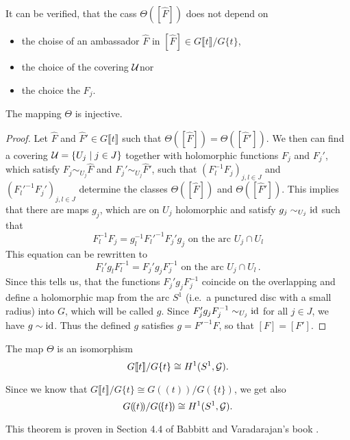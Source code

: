 It can be verified, that the cass $\Theta([\hat F])$ does not depend on
\begin{itemize}
  \item the choise of an ambassador $\hat F$ in
    $[\hat F]\in G\llbracket t\rrbracket/G\{t\}$\PROBLEM[proof!],
  \item the choice of the covering $\mathcal{U}$\PROBLEM[proof!] nor
  \item the choice the $F_j$\PROBLEM[proof!].
\end{itemize}
\begin{lem}
  The mapping $\Theta$ is injective.
\end{lem}
\begin{proof}
  Let $\hat F$ and $\hat F'\in G\llbracket t\rrbracket$ such that
  $\Theta([\hat F])=\Theta([\hat F'])$.
  We then can find a covering $\mathcal{U}=\{U_j\mid j\in J\}$ together with
  holomorphic functions $F_j$ and $F_j'$, which satisfy
  $F_j\sim_{U_j}\hat F$ and $F_j'\sim_{U_j}\hat F'$, such that
  $(F_l^{-1}F_j)_{j,l\in J}$ and $(F_l'^{-1}F_j')_{j,l\in J}$ determine the
  classes $\Theta([\hat F])$ and $\Theta([\hat F'])$.
  This implies that there are maps $g_j$, which are on $U_j$ holomorphic and
  satisfy $g_j\sim_{U_j}\operatorname{id}$ such that
  \[
    F_l^{-1}F_j=g_l^{-1}F_l'^{-1}F_j'g_j
    \text{~on~the~arc~} U_j\cap U_l
  \]
  This equation can be rewritten to
  \[
    F_l'g_lF_l^{-1}=F_j'g_jF_j^{-1}
    \text{~on~the~arc~} U_j\cap U_l \,.
  \]
  Since this tells us, that the functions $F_j'g_jF_j^{-1}$ coincide on
  the overlapping and define a holomorphic map from the arc $S^1$ (i.e.\ a
  punctured disc with a small radius) into $G$, which will be called $g$.
  Since $F_j'g_jF_j^{-1}\sim_{U_j}\operatorname{id}$ for all $j\in J$, we have
  $g\sim\operatorname{id}$.
  Thus the defined $g$ satisfies $g=F'^{-1}F$, so that $[F]=[F']$.
\end{proof}
\begin{thm}\label{thm:thm1helpMalgSibuy}
  The map $\Theta$ is an isomorphism
  \[
    G\llbracket t\rrbracket/G\{t\}\cong H^1(S^1,\mathcal{G}).
  \]
  \begin{s-rem}
    Since we know that
    $G\llbracket t\rrbracket/G\{t\}\cong G(\!(t)\!)/G(\!\{t\}\!)$\TODO[(cf~??)],
    we get also
    \[
      G(\!(t)\!)/G(\!\{t\}\!)\cong H^1(S^1,\mathcal{G}).
    \]
  \end{s-rem}
\end{thm}
This theorem is proven in Section 4.4 of Babbitt and Varadarajan's book
\cite{babbitt1989local}.

